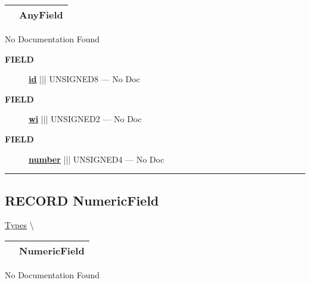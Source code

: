 {\renewcommand{\arraystretch}{1.5}
\begin{tabularx}{\textwidth}{|>{\raggedright\arraybackslash}l|X|}
\hline
\hspace{0pt}\mytexttt{\color{red} } & \textbf{AnyField} \\
\hline
\end{tabularx}
}

\par





No Documentation Found







\par
\begin{description}
\item [\colorbox{tagtype}{\color{white} \textbf{\textsf{FIELD}}}] \textbf{\underline{id}} ||| UNSIGNED8 --- No Doc
\item [\colorbox{tagtype}{\color{white} \textbf{\textsf{FIELD}}}] \textbf{\underline{wi}} ||| UNSIGNED2 --- No Doc
\item [\colorbox{tagtype}{\color{white} \textbf{\textsf{FIELD}}}] \textbf{\underline{number}} ||| UNSIGNED4 --- No Doc
\end{description}





\rule{\linewidth}{0.5pt}
\subsection*{\textsf{\colorbox{headtoc}{\color{white} RECORD}
NumericField}}

\hypertarget{ecldoc:ml_core.types.numericfield}{}
\hspace{0pt} \hyperlink{ecldoc:ML_Core.Types}{Types} \textbackslash 

{\renewcommand{\arraystretch}{1.5}
\begin{tabularx}{\textwidth}{|>{\raggedright\arraybackslash}l|X|}
\hline
\hspace{0pt}\mytexttt{\color{red} } & \textbf{NumericField} \\
\hline
\end{tabularx}
}

\par





No Documentation Found







